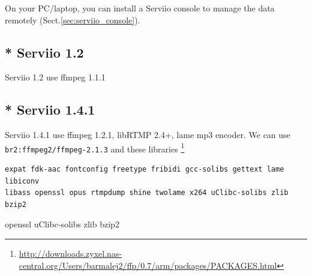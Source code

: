 On your PC/laptop, you can install a Serviio console to manage the data
remotely (Sect.\ref{sec:serviio_console}).


% 

% 


\subsection{* Serviio 1.2}

Serviio 1.2 use ffmpeg 1.1.1


\subsection{* Serviio 1.4.1}

Serviio 1.4.1 use ffmpeg 1.2.1, libRTMP 2.4+, lame mp3 encoder.
We can use \verb!br2:ffmpeg2/ffmpeg-2.1.3! and these libraries
\footnote{\url{http://downloads.zyxel.nas-central.org/Users/barmalej2/ffp/0.7/arm/packages/PACKAGES.html}}
\begin{verbatim}
expat fdk-aac fontconfig freetype fribidi gcc-solibs gettext lame libiconv
libass openssl opus rtmpdump shine twolame x264 uClibc-solibs zlib bzip2
\end{verbatim}

openssl uClibc-solibs zlib bzip2


% 
% 

